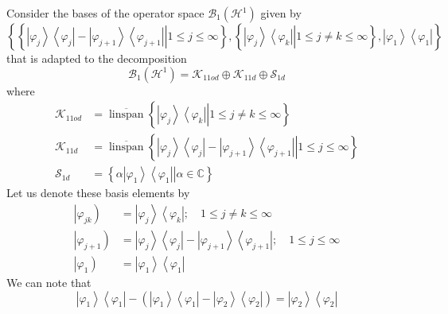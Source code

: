 \documentclass[aps,preprint]{revtex4}%
\begin{document}
Consider the bases of the operator space $\mathcal{B}_{1}\left(
\mathcal{H}^{1}\right)  $ given by%
\begin{equation}
\left\{  \left\{  \left.  \left\vert \varphi_{j}\right\rangle \left\langle
\varphi_{j}\right\vert -\left\vert \varphi_{j+1}\right\rangle \left\langle
\varphi_{j+1}\right\vert \right\vert 1\leq j\leq\infty\right\}  ,\left\{
\left.  \left\vert \varphi_{j}\right\rangle \left\langle \varphi
_{k}\right\vert \right\vert 1\leq j\neq k\leq\infty\right\}  ,\left\vert
\varphi_{1}\right\rangle \left\langle \varphi_{1}\right\vert \right\}
\end{equation}
that is adapted to the decomposition
\begin{equation}
\mathcal{B}_{1}\left(  \mathcal{H}^{1}\right)  =\mathcal{K}_{11od}%
\oplus\mathcal{K}_{11d}\oplus\mathcal{S}_{1d} \label{graddec}%
\end{equation}
where
\begin{align}
\mathcal{K}_{11od}  &  =\overline{\operatorname{linspan}}\left\{  \left.
\left\vert \varphi_{j}\right\rangle \left\langle \varphi_{k}\right\vert
\right\vert 1\leq j\neq k\leq\infty\right\} \nonumber\\
\mathcal{K}_{11d}  &  =\overline{\operatorname{linspan}}\left\{  \left.
\left\vert \varphi_{j}\right\rangle \left\langle \varphi_{j}\right\vert
-\left\vert \varphi_{j+1}\right\rangle \left\langle \varphi_{j+1}\right\vert
\right\vert 1\leq j\leq\infty\right\} \nonumber\\
\mathcal{S}_{1d}  &  =\left\{  \left.  \alpha\left\vert \varphi_{1}%
\right\rangle \left\langle \varphi_{1}\right\vert \right\vert \alpha
\in\mathbb{C}\right\}
\end{align}
Let us denote these basis elements by
\begin{align}
\left\vert \varphi_{jk}\right)   &  =\left\vert \varphi_{j}\right\rangle
\left\langle \varphi_{k}\right\vert ;\quad1\leq j\neq k\leq\infty\nonumber\\
\left\vert \varphi_{j+1}\right)   &  =\left\vert \varphi_{j}\right\rangle
\left\langle \varphi_{j}\right\vert -\left\vert \varphi_{j+1}\right\rangle
\left\langle \varphi_{j+1}\right\vert ;\quad1\leq j\leq\infty\nonumber\\
\left\vert \varphi_{1}\right)   &  =\left\vert \varphi_{1}\right\rangle
\left\langle \varphi_{1}\right\vert
\end{align}
We can note that
\begin{equation}
\left\vert \varphi_{1}\right\rangle \left\langle \varphi_{1}\right\vert
-\left(  \left\vert \varphi_{1}\right\rangle \left\langle \varphi
_{1}\right\vert -\left\vert \varphi_{2}\right\rangle \left\langle \varphi
_{2}\right\vert \right)  =\left\vert \varphi_{2}\right\rangle \left\langle
\varphi_{2}\right\vert
\end{equation}
\end{document}
